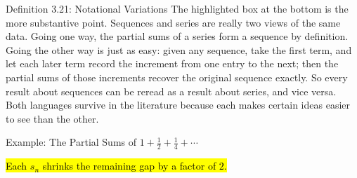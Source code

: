 \documentclass[aspectratio=169,12pt,t]{beamer}
\begin{document}
{\begin{frame}{Definition 3.21: Notational Variations}
{    The highlighted box at the bottom is the more substantive
    point. Sequences and series are really two views of the same
    data. Going one way, the partial sums of a series form a
    sequence by definition. Going the other way is just as easy:
    given any sequence, take the first term, and let each later
    term record the increment from one entry to the next; then the
    partial sums of those increments recover the original sequence
    exactly. So every result about sequences can be reread as a
    result about series, and vice versa. Both languages survive in
    the literature because each makes certain ideas easier to see
    than the other.
  }
\end{frame}

\begin{frame}{Example: The Partial Sums of $1 + \tfrac{1}{2} + \tfrac{1}{4} + \cdots$}
  \begin{center}
  \end{center}

  \vspace{0.2em}
  \begin{center}
    \hl{Each $s_n$ shrinks the remaining gap by a factor of $2$.}
  \end{center}


\end{frame}}
\end{document}
